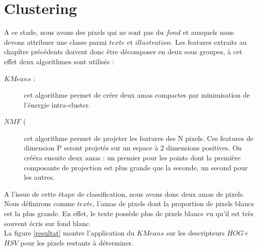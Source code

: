 \documentclass{book}
\begin{document}
\chapter{Clustering}

A ce stade, nous avons des pixels qui ne sont pas du $fond$ et auxquels nous devons attribuer une classe parmi $texte$ et $illustration$.
Les features extraits au chapître précédents doivent donc être décomposer en deux sous groupes, à cet effet deux algorithmes sont utilisés :
\begin{description} %

\item[$KMeans$ :] cet algorithme permet de créer deux amas compactes par minimisation de l'énergie intra-cluster.
\item[$NMF$ (\begin{itshape}Non-Negative Matrix Factorization\end{itshape} :] cet algorithme permet de projeter les features des N pixels. Ces features de dimension P seront projetés sur un espace à 2 dimensions positives. On crééra ensuite
deux amas : un premier pour les points dont la première composante de projection est plus grande que la seconde, un second pour les autres.

\end{description}

A l'issue de cette étape de classification, nous avons donc deux amas de pixels. Nous définirons comme $texte$, l'amas de pixels dont la proportion de pixels blancs
est la plus grande. En effet, le texte possède plus de pixels blancs vu qu'il est très souvent écris sur fond blanc.\\
La figure \ref{resultat} montre l'application du $KMeans$ sur les descripteurs $HOG$+$HSV$ pour les pixels restants à déterminer.
\end{document}
